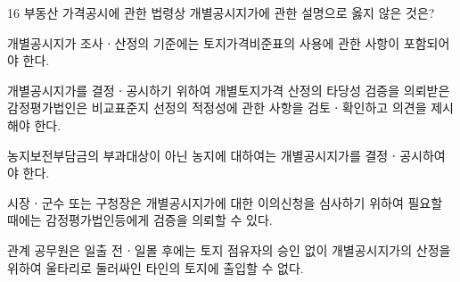 \begin{question}{16}
부동산 가격공시에 관한 법령상 개별공시지가에 관한 설명으로 옳지 않은 것은?
\begin{choices}
  \item 개별공시지가 조사ㆍ산정의 기준에는 토지가격비준표의 사용에 관한 사항이 포함되어야 한다.
  \item 개별공시지가를 결정ㆍ공시하기 위하여 개별토지가격 산정의 타당성 검증을 의뢰받은 감정평가법인은 비교표준지 선정의 적정성에 관한 사항을 검토ㆍ확인하고 의견을 제시해야 한다.
  \item 농지보전부담금의 부과대상이 아닌 농지에 대하여는 개별공시지가를 결정ㆍ공시하여야 한다.
  \item 시장ㆍ군수 또는 구청장은 개별공시지가에 대한 이의신청을 심사하기 위하여 필요할 때에는 감정평가법인등에게 검증을 의뢰할 수 있다.
  \item 관계 공무원은 일출 전ㆍ일몰 후에는 토지 점유자의 승인 없이 개별공시지가의 산정을 위하여 울타리로 둘러싸인 타인의 토지에 출입할 수 없다.
\end{choices}
\end{question}
